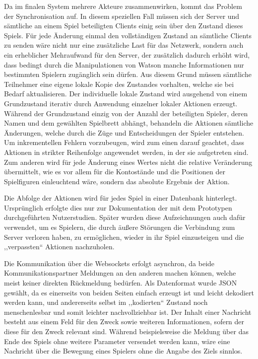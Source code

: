 \documentclass[german]{cgspaper} %
\begin{document}
Da im finalen System mehrere Akteure zusammenwirken, kommt das Problem der Synchronisation auf. In diesem speziellen Fall müssen sich der Server und sämtliche an einem Spiel beteiligten Clients einig sein über den Zustand dieses Spiels.
Für jede Änderung einmal den vollständigen Zustand an sämtliche Clients zu senden wäre nicht nur eine zusätzliche Last für das Netzwerk, sondern auch ein erheblicher Mehraufwand für den Server, der zusätzlich dadurch erhöht wird, dass bedingt durch die Manipulationen von Watson manche Informationen nur bestimmten Spielern zugänglich sein dürfen.
Aus diesem Grund müssen sämtliche Teilnehmer eine eigene lokale Kopie des Zustandes vorhalten, welche sie bei Bedarf aktualisieren.
Der individuelle lokale Zustand wird ausgehend von einem Grundzustand iterativ durch Anwendung einzelner lokaler Aktionen erzeugt.
Während der Grundzustand einzig von der Anzahl der beteiligten Spieler, deren Namen und dem gewählten Spielbrett abhängt, behandeln die Aktionen sämtliche Änderungen, welche durch die Züge und Entscheidungen der Spieler entstehen.
Um inkrementellen Fehlern vorzubeugen, wird zum einen darauf geachtet, dass Aktionen in strikter Reihenfolge angewendet werden, in der sie aufgetreten sind.
Zum anderen wird für jede Änderung eines Wertes nicht die relative Veränderung übermittelt, wie es vor allem für die Kontostände und die Positionen der Spielfiguren einleuchtend wäre, sondern das absolute Ergebnis der Aktion.

Die Abfolge der Aktionen wird für jedes Spiel in einer Datenbank hinterlegt.  Ursprünglich erfolgte dies nur zur Dokumentation der mit dem Prototypen durchgeführten Nutzerstudien.
Später wurden diese Aufzeichnungen auch dafür verwendet, um es Spielern, die durch äußere Störungen die Verbindung zum Server verloren haben, zu ermöglichen, wieder in ihr Spiel einzusteigen und die ,,verpassten`` Aktionen nachzuholen.

Die Kommunikation über die Websockets erfolgt asynchron, da beide Kommunikationspartner Meldungen an den anderen machen können, welche meist keiner direkten Rückmeldung bedürfen.
Als Datenformat wurde JSON gewählt, da es einerseits von beiden Seiten einfach erzeugt ist und leicht dekodiert werden kann, und andererseits selbst im ,,kodierten`` Zustand noch menschenlesbar und somit leichter nachvollziehbar ist.
Der Inhalt einer Nachricht besteht aus einem Feld für den Zweck sowie weiteren Informationen, sofern der diese für den Zweck relevant sind. Während beispielsweise die Meldung über das Ende des Spiels ohne weitere Parameter versendet werden kann, wäre eine Nachricht über die Bewegung eines Spielers ohne die Angabe des Ziels sinnlos.
\end{document}
